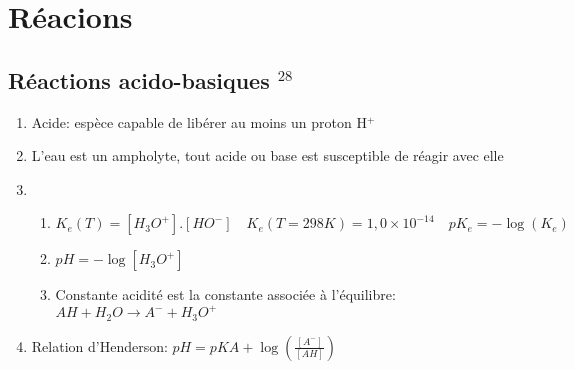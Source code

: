 \documentclass[fleqn]{article}
\theoremstyle{definition} \newtheorem*{defi}{D\'efinition}
\theoremstyle{definition} \newtheorem*{theo}{Th\'eor\`eme}
\theoremstyle{definition} \newtheorem*{coro}{Corollaire}
\theoremstyle{remark} \newtheorem*{rqs}{Remarques}
\theoremstyle{definition} \newtheorem*{prop}{Propri\'et\'e}
\begin{document}
\section{R\'eacions}
\subsection{R\'eactions acido-basiques $^{28}$}
\begin{enumerate}
	\item Acide: esp\`ece capable de lib\'erer au moins un proton H$^+$
	\item L'eau est un ampholyte, tout acide ou base est susceptible de r\'eagir avec elle
	\item \begin{enumerate} \item $K_e(T) = [H_3O^+].[HO^-] \quad K_e(T = 298K) = 1,0\times10^ {-14}\quad pK_e = -\log(K_e)$
		\item $pH = -\log[H_3O^+]$
		\item Constante acidit\'e est la constante associ\'ee \`a l'\'equilibre:\\ $ AH + H_2O \rightarrow A^- + H_3O^+$
		\end{enumerate}
	\item Relation d'Henderson: $pH = pKA + \log(\frac{[A^-]}{[AH]})$
\end{enumerate}

\newpage
\end{document}
